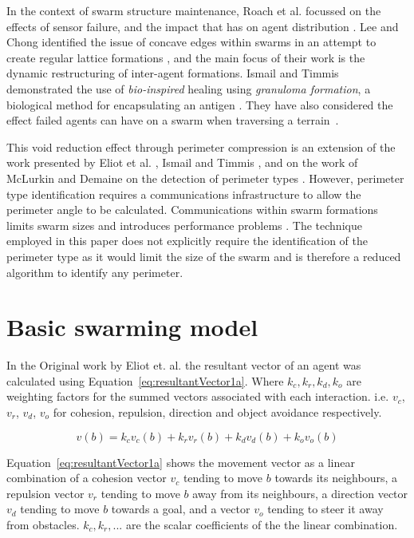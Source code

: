\documentclass[12pt,a4paper]{IEEEtran}
\begin{document}
In the context of swarm structure maintenance, Roach et al. focussed on the effects of sensor failure, and the impact that has on agent distribution \cite{RMT:15}. Lee and Chong identified the issue of concave edges within swarms in an attempt to create regular lattice formations \cite{GN:08}, and the main focus of their work is the dynamic restructuring of inter-agent formations. Ismail and Timmis demonstrated the use of \textit{bio-inspired} healing using \textit{granuloma formation}, a biological method for encapsulating an antigen \cite{IT:10}. They have also considered the effect failed agents can have on a swarm when traversing a terrain~\cite{TIBW:16}. 

This void reduction effect through perimeter compression is an extension of the work presented by Eliot et al. \cite{eliot2019void}, Ismail and Timmis \cite{IT:10,TIBW:16}, and on the work of McLurkin and Demaine on the detection of perimeter types \cite{mclurkin2009}. However, perimeter type identification requires a communications infrastructure to allow the perimeter angle to be calculated. Communications within swarm formations limits swarm sizes and introduces performance problems \cite{fu2020formation}. The technique employed in this paper does not explicitly require the identification of the perimeter type as it would limit the size of the swarm\cite{eliot2019void,GN:08} and is therefore a reduced algorithm to identify any perimeter.

\section{Basic swarming model}\label{basicModel}
In the Original work by Eliot et. al. the resultant vector of an agent was calculated using Equation~\ref{eq:resultantVector1a}. Where $k_c,k_r,k_d,k_o$ are weighting factors for the summed vectors associated with each interaction. i.e. $v_c$, $v_r$, $v_d$, $v_o$ for cohesion, repulsion, direction and object avoidance respectively. 

\begin{equation}\label{eq:resultantVector1a}
	v(b) = k_cv_c(b) + k_rv_r(b) + k_dv_d(b) + k_ov_o(b)
\end{equation}

Equation~\ref{eq:resultantVector1a} shows the movement vector as a linear combination of a cohesion vector $v_c$ tending to move $b$ towards its neighbours, a repulsion vector $v_r$ tending to move $b$ away from its neighbours, a direction vector  $v_d$ tending to move $b$ towards a goal, and a vector $v_o$ tending to steer it away from obstacles. $k_c, k_r, ...$ are the scalar coefficients of the the linear combination.
\end{document}
